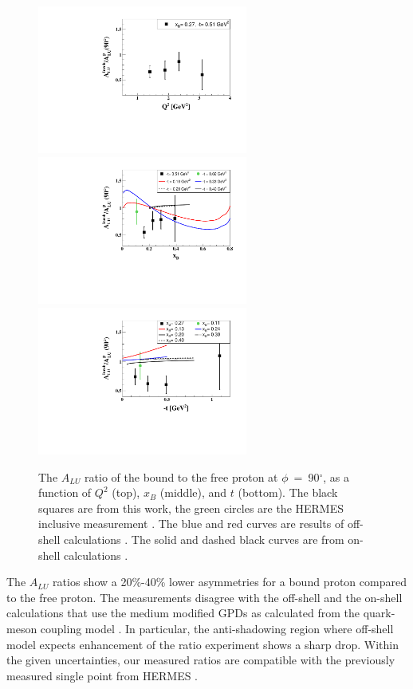 \documentclass[twocolumn,nofootinbib,showpacs,prl,superscriptaddress,secnumarabic,amssymb,nobibnotes,aps,floatfix]{revtex4}
\begin{document}
\begin{figure}[tb]
\centering
\includegraphics[width=6.9cm]{figs/ALU_ratioInc_Q2_shortscenrario.pdf}\\
\includegraphics[width=6.9cm]{figs/ALU_ratioInc_x_shortscenrario.pdf}\\
\includegraphics[width=6.9cm]{figs/ALU_ratioInc_t_shortscenrario.pdf}
\caption{ The $A_{LU}$ ratio of the bound to the free proton at 
   $\phi$~=~90$^{\circ}$, as a function of $Q^2$ (top), $x_B$ (middle), and $t$ 
   (bottom). The black squares are from this work, the green circles are the 
HERMES inclusive measurement \cite{Airapetian:2009cga}. The blue and red curves 
are results of off-shell calculations \cite{simonetta_2}. The solid and dashed 
black curves are from on-shell calculations \cite{Guzey:2008fe}.} 
\label{fig:incoh_EMC_ratio_ALU_proton}
\end{figure}

The $A_{LU}$ ratios show a 20\%-40\% lower asymmetries for a bound proton compared 
to the free proton. The measurements disagree with the off-shell \cite{simonetta_2} and the on-shell calculations that use the medium modified GPDs as calculated from the quark-meson coupling model \cite{Guzey:2008fe}.
In particular, the anti-shadowing region where off-shell model expects enhancement of the ratio experiment shows a sharp drop. Within the given 
uncertainties, our measured ratios are compatible with the previously measured 
single point from HERMES \cite{Airapetian}.
\end{document}
